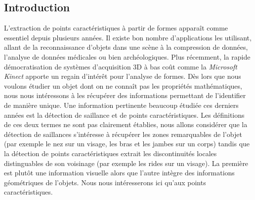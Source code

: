 \subsection{Introduction}
%
L'extraction de points caractéristiques à partir de formes apparaît comme
essentiel depuis plusieurs années. Il existe bon nombre d'applications les
utilisant, allant de la reconnaissance d'objets dans une scène à la compression
de données, l'analyse de données médicales ou bien archéologiques. Plus
récemment, la rapide démocratisation de systèmes d'acquisition 3D à bas coût
comme la \emph{Microsoft Kinect} apporte un regain d'intérêt pour l'analyse de
formes.
%
%
Dès lors que nous voulons étudier un objet dont on ne connaît pas les propriétés
mathématiques, nous nous intéressons à les récupérer des informations permettant
de l'identifier de manière unique. Une information pertinente beaucoup étudiée
ces derniers années est la détection de saillance et de points caractéristiques.
Les définitions de ces deux termes ne sont pas clairement établies, nous allons
considérer que la détection de saillances s'intéresse à récupérer les zones
remarquables de l'objet (par exemple le nez sur un visage, les bras et les
jambes sur un corps) tandis que la détection de points caractéristiques extrait
les discontinuités locales distinguables de son voisinage (par exemple les rides
sur un visage). La première est plutôt une information visuelle alors que
l'autre intègre des informations géométriques de l'objets. Nous nous
intéresserons ici qu'aux points caractéristiques.
%
%
